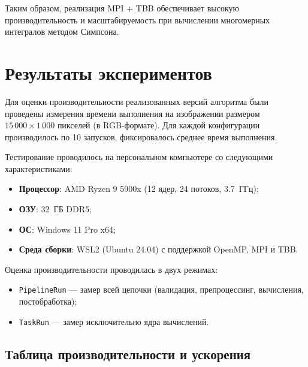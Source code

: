 \documentclass[14pt,a4paper]{extarticle}
\begin{document}
Таким образом, реализация MPI + TBB обеспечивает высокую производительность и масштабируемость при вычислении многомерных интегралов методом Симпсона.

\section{Результаты экспериментов}

Для оценки производительности реализованных версий алгоритма были проведены измерения времени выполнения на изображении размером $15\,000 \times 1\,000$ пикселей (в RGB-формате). 
Для каждой конфигурации производилось по 10 запусков, фиксировалось среднее время выполнения.

Тестирование проводилось на персональном компьютере со следующими характеристиками:

\begin{itemize}
    \item \textbf{Процессор}: AMD Ryzen 9 5900x (12 ядер, 24 потоков, 3.7~ГГц);
    \item \textbf{ОЗУ}: 32~ГБ DDR5;
    \item \textbf{ОС}: Windows 11 Pro x64;
    \item \textbf{Среда сборки}: WSL2 (Ubuntu 24.04) с поддержкой OpenMP, MPI и TBB.
\end{itemize}

Оценка производительности проводилась в двух режимах:
\begin{itemize}
    \item \texttt{PipelineRun} — замер всей цепочки (валидация, препроцессинг, вычисления, постобработка);
    \item \texttt{TaskRun} — замер исключительно ядра вычислений.
\end{itemize}

\subsection{Таблица производительности и ускорения}
\end{document}

